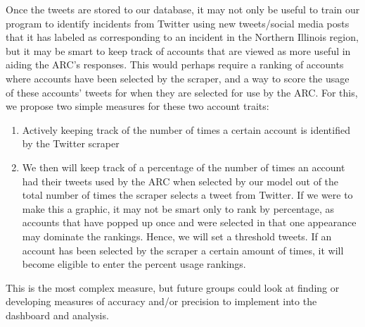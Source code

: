 \documentclass[titlepage, 12pt]{article}
\begin{document}
\hspace{0.5 cm}Once the tweets are stored to our database, it may not only be useful to train our program to identify incidents from Twitter using new tweets/social media posts that it has labeled as corresponding to an incident in the Northern Illinois region, but it may be smart to keep track of accounts that are viewed as more useful in aiding the ARC's responses. This would perhaps require a ranking of accounts where accounts have been selected by the scraper, and a way to score the usage of these accounts' tweets for when they are selected for use by the ARC. For this, we propose two simple measures for these two account traits:
\begin{enumerate}
    \item Actively keeping track of the number of times a certain account is identified by the Twitter scraper
    \item We then will keep track of a percentage of the number of times an account had their tweets used by the ARC when selected by our model out of the total number of times the scraper selects a tweet from Twitter. If we were to make this a graphic, it may not be smart only to rank by percentage, as accounts that have popped up once and were selected in that one appearance may dominate the rankings. Hence, we will set a threshold tweets. If an account has been selected by the scraper a certain amount of times, it will become eligible to enter the percent usage rankings.
\end{enumerate}

This is the most complex measure, but future groups could look at finding or developing measures of accuracy and/or precision to implement into the dashboard and analysis.


\end{document}
